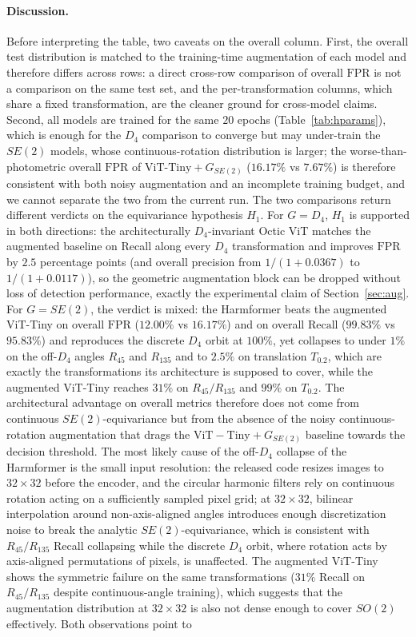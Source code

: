 \documentclass{article}
\begin{document}
\paragraph{Discussion.} Before interpreting the table, two caveats on the overall column. First, the overall test distribution is matched to the training-time augmentation of each model and therefore differs across rows: a direct cross-row comparison of overall $\mathrm{FPR}$ is not a comparison on the same test set, and the per-transformation columns, which share a fixed transformation, are the cleaner ground for cross-model claims. Second, all models are trained for the same $20$ epochs (Table~\ref{tab:hparams}), which is enough for the $D_4$ comparison to converge but may under-train the $SE(2)$ models, whose continuous-rotation distribution is larger; the worse-than-photometric overall $\mathrm{FPR}$ of $\mathrm{ViT\text{-}Tiny}+G_{SE(2)}$ ($16.17\%$ vs $7.67\%$) is therefore consistent with both noisy augmentation and an incomplete training budget, and we cannot separate the two from the current run. The two comparisons return different verdicts on the equivariance hypothesis $H_1$. For $G = D_4$, $H_1$ is supported in both directions: the architecturally $D_4$-invariant Octic ViT matches the augmented baseline on Recall along every $D_4$ transformation and improves $\mathrm{FPR}$ by $2.5$ percentage points (and overall precision from $1/(1+0.0367)$ to $1/(1+0.0117)$), so the geometric augmentation block can be dropped without loss of detection performance, exactly the experimental claim of Section~\ref{sec:aug}. For $G = SE(2)$, the verdict is mixed: the Harmformer beats the augmented ViT-Tiny on overall $\mathrm{FPR}$ ($12.00\%$ vs $16.17\%$) and on overall $\mathrm{Recall}$ ($99.83\%$ vs $95.83\%$) and reproduces the discrete $D_4$ orbit at $100\%$, yet collapses to under $1\%$ on the off-$D_4$ angles $R_{45}$ and $R_{135}$ and to $2.5\%$ on translation $T_{0.2}$, which are exactly the transformations its architecture is supposed to cover, while the augmented ViT-Tiny reaches $31\%$ on $R_{45}/R_{135}$ and $99\%$ on $T_{0.2}$. The architectural advantage on overall metrics therefore does not come from continuous $SE(2)$-equivariance but from the absence of the noisy continuous-rotation augmentation that drags the $\mathrm{ViT-Tiny}+G_{SE(2)}$ baseline towards the decision threshold. The most likely cause of the off-$D_4$ collapse of the Harmformer is the small input resolution: the released code resizes images to $32\times 32$ before the encoder, and the circular harmonic filters rely on continuous rotation acting on a sufficiently sampled pixel grid; at $32\times 32$, bilinear interpolation around non-axis-aligned angles introduces enough discretization noise to break the analytic $SE(2)$-equivariance, which is consistent with $R_{45}/R_{135}$ Recall collapsing while the discrete $D_4$ orbit, where rotation acts by axis-aligned permutations of pixels, is unaffected. The augmented ViT-Tiny shows the symmetric failure on the same transformations ($31\%$ Recall on $R_{45}/R_{135}$ despite continuous-angle training), which suggests that the augmentation distribution at $32\times 32$ is also not dense enough to cover $SO(2)$ effectively. Both observations point to 
\end{document}
